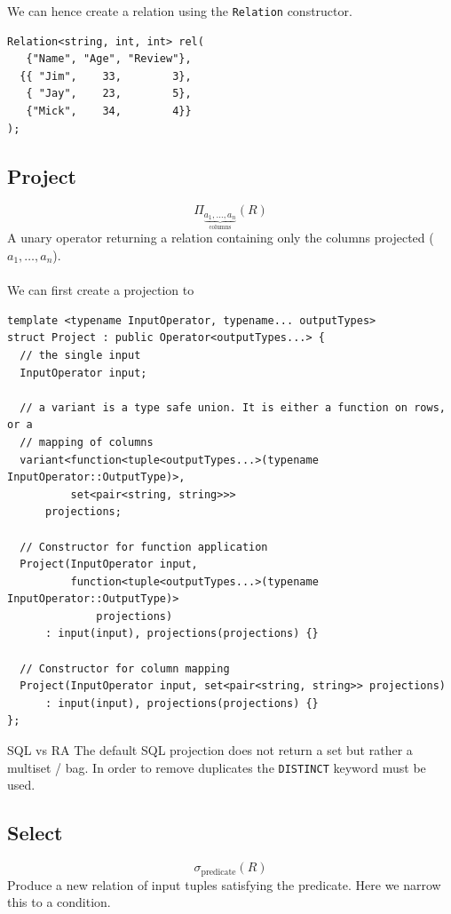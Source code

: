 We can hence create a relation using the \texttt{Relation} constructor.
\begin{verbatim}
Relation<string, int, int> rel(
   {"Name", "Age", "Review"},
  {{ "Jim",    33,        3}, 
   { "Jay",    23,        5}, 
   {"Mick",    34,        4}}
);
\end{verbatim}

\subsection{Project}
\[\Pi_{\underbrace{{a_1, \dots, a_n}}_\text{columns}}(R)\]
A unary operator returning a relation containing only the columns projected ($a_1, \dots, a_n$).
\\
\\ We can first create a projection to 
\begin{verbatim}
template <typename InputOperator, typename... outputTypes>
struct Project : public Operator<outputTypes...> {
  // the single input
  InputOperator input;

  // a variant is a type safe union. It is either a function on rows, or a 
  // mapping of columns 
  variant<function<tuple<outputTypes...>(typename InputOperator::OutputType)>,
          set<pair<string, string>>>
      projections;

  // Constructor for function application
  Project(InputOperator input,
          function<tuple<outputTypes...>(typename InputOperator::OutputType)>
              projections)
      : input(input), projections(projections) {}

  // Constructor for column mapping
  Project(InputOperator input, set<pair<string, string>> projections)
      : input(input), projections(projections) {}
};
\end{verbatim}

\begin{sidenotebox}{SQL vs RA}
  The default SQL projection does not return a set but rather a multiset / bag. In order to remove duplicates the \texttt{DISTINCT} keyword must be used.
\end{sidenotebox}

\subsection{Select}
\[\sigma_{\text{predicate}}(R) \]
Produce a new relation of input tuples satisfying the predicate. Here we narrow this to a condition.

